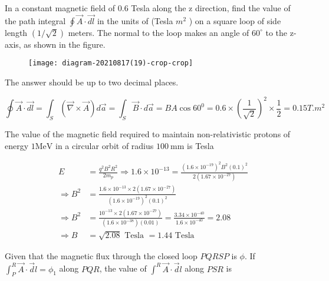 \begin{enumerate}
	\begin{minipage}{\textwidth}
		\item In a constant magnetic field of $0.6$ Tesla along the $\mathrm{z}$ direction, find the value of the path integral $\oint \vec{A} \cdot \overrightarrow{d l}$ in the units of (Tesla $m^{2}$ ) on a square loop of side length $(1 / \sqrt{2})$ meters. The normal to the loop makes an angle of $60^{\circ}$ to the z-axis, as shown in the figure.\\
		\begin{figure}[H]
			\centering
			\texttt{[image: diagram-20210817(19)-crop-crop]}
		\end{figure}	
		The answer should be up to two decimal places.
	\end{minipage}
	\begin{answer}	
		$$\oint \vec{A} \cdot \overrightarrow{d l}=\int_{S}(\vec{\nabla} \times \vec{A}) d \vec{a}=\int_{S} \vec{B} \cdot d \vec{a}=B A \cos 60^{0}=0.6 \times\left(\frac{1}{\sqrt{2}}\right)^{2} \times \frac{1}{2}=0.15 T . m^{2}$$	
	\end{answer}
	\begin{minipage}{\textwidth}
		\item The value of the magnetic field required to maintain non-relativistic protons of energy $1 \mathrm{MeV}$ in a circular orbit of radius $100 \mathrm{~mm}$ is Tesla
	\end{minipage}
	\begin{answer}
	\begin{align*}	
	E&=\frac{q^{2} B^{2} R^{2}}{2 m_{p}} \Rightarrow 1.6 \times 10^{-13}=\frac{\left(1.6 \times 10^{-19}\right)^{2} B^{2}(0.1)^{2}}{2\left(1.67 \times 10^{-27}\right)}\\
	\Rightarrow B^{2}&=\frac{1.6 \times 10^{-13} \times 2\left(1.67 \times 10^{-27}\right)}{\left(1.6 \times 10^{-19}\right)^{2}(0.1)^{2}} \\
	\Rightarrow B^{2}&=\frac{10^{-13} \times 2\left(1.67 \times 10^{-27}\right)}{\left(1.6 \times 10^{-38}\right)(0.01)}=\frac{3.34 \times 10^{-40}}{1.6 \times 10^{-40}}=2.08\\
	\Rightarrow B&=\sqrt{2.08} \text { Tesla }=1.44 \text { Tesla }
	\end{align*}	
	\end{answer}
	\begin{minipage}{\textwidth}
		\item Given that the magnetic flux through the closed loop $P Q R S P$ is $\phi$. If $\int_{P}^{R} \vec{A} \cdot \vec{d} l=\phi_{1}$ along $P Q R$, the value of $\int^{R} \vec{A} \cdot \vec{d} l$ along $P S R$ is

\end{minipage}
\end{enumerate}
